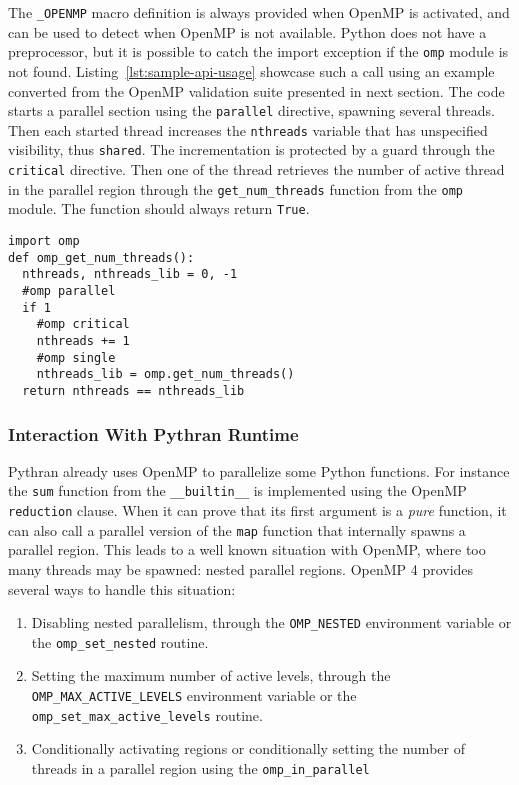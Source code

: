 \documentclass[conference]{IEEEtran}
\begin{document}
The \texttt{\_OPENMP} macro definition is always provided when OpenMP is
activated, and can be used to detect when OpenMP is not available. Python does
not have a preprocessor, but it is possible to catch the import exception if the
\texttt{omp} module is not found. Listing~\ref{lst:sample-api-usage} showcase
such a call using an example converted from the OpenMP validation suite
presented in next section. The code starts a parallel section using the
\texttt{parallel} directive, spawning several threads. Then each started thread
increases the \texttt{nthreads} variable that has unspecified visibility, thus
\texttt{shared}. The incrementation is protected by a guard through the
\texttt{critical} directive. Then one of the thread retrieves the number of
active thread in the parallel region through the \texttt{get\_num\_threads}
function from the \texttt{omp} module. The function should always return
\texttt{True}.

\begin{lstlisting}[float,label={lst:sample-api-usage},caption={Example of
        OpenMP API usage from Python.}]
import omp
def omp_get_num_threads():
  nthreads, nthreads_lib = 0, -1
  #omp parallel
  if 1
    #omp critical
    nthreads += 1
    #omp single
    nthreads_lib = omp.get_num_threads()
  return nthreads == nthreads_lib
\end{lstlisting}

\subsubsection{Interaction With Pythran Runtime}

Pythran already uses OpenMP to parallelize some Python functions. For instance
the \texttt{sum} function from the \texttt{\_\_builtin\_\_} is implemented using
the OpenMP \texttt{reduction} clause. When it can prove that its first argument
is a \emph{pure} function, it can also call a parallel version of the
\texttt{map} function that internally spawns a parallel region. This leads to a
well known situation with OpenMP, where too many threads may be spawned: nested
parallel regions. OpenMP 4 provides several ways to handle this situation:

\begin{enumerate}

    \item Disabling nested parallelism, through the \texttt{OMP\_NESTED}
        environment variable or the \texttt{omp\_set\_nested} routine.

    \item Setting the maximum number of active levels, through the
        \texttt{OMP\_MAX\_ACTIVE\_LEVELS} environment variable or the
        \texttt{omp\_set\_max\_active\_levels} routine.
            

    \item Conditionally activating regions or conditionally setting the number
        of threads in a parallel region using the \texttt{omp\_in\_parallel}

\end{enumerate}
\end{document}
